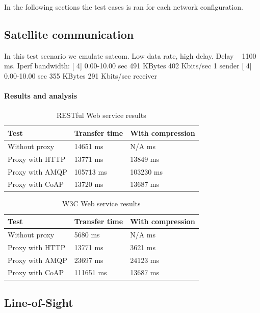 In the following sections the test cases is ran for each network
configuration.


\subsection{Satellite communication}

In this test scenario we emulate \gls{satcom}. Low data rate, high delay.
Delay ~ 1100 ms.
Iperf bandwidth:
[  4]   0.00-10.00  sec   491 KBytes   402 Kbits/sec    1             sender
[  4]   0.00-10.00  sec   355 KBytes   291 Kbits/sec                  receiver


\paragraph{Results and analysis}

\begin{table}[h!]
\begin{tabular}{| l | l | l |}
\hline
  \textbf{Test} & \textbf{Transfer time} & \textbf{With compression}\\ \hline
  Without proxy & 14651 ms & N/A ms \\ \hline
  Proxy with HTTP & 13771 ms & 13849 ms \\ \hline
  Proxy with AMQP & 105713 ms & 103230 ms \\ \hline
  Proxy with CoAP & 13720 ms & 13687 ms \\ \hline
\end{tabular}
\caption{RESTful Web service results}
\end{table}

\begin{table}[h!]
\begin{tabular}{| l | l | l |}
\hline
  \textbf{Test} & \textbf{Transfer time} & \textbf{With compression}\\ \hline
  Without proxy & 5680 ms & N/A ms \\ \hline
  Proxy with HTTP & 13771 ms & 3621 ms \\ \hline
  Proxy with AMQP & 23697 ms & 24123 ms \\ \hline
  Proxy with CoAP & 111651 ms & 13687 ms \\ \hline
\end{tabular}
\caption{W3C Web service results}
\end{table}

\subsection{Line-of-Sight}

